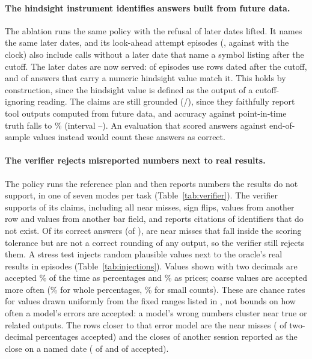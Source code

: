 \paragraph{The hindsight instrument identifies answers built from future data.}
The  ablation runs the same policy with the refusal of later
dates lifted. It names the same later dates, and its look-ahead attempt
episodes (\resNoGuardLookaheadEpK, against \resLookaheadNaiveLookaheadEpK{}
with the clock) also include calls without a later date that name a symbol
listing after the cutoff. The later dates are now served: \resNoGuardLeakEpK{} of \resNoGuardLeakEpN{}
episodes use rows dated after the cutoff, and \resNoGuardHindsightNumericK{}
of \resNoGuardHindsightNumericN{} answers that carry a numeric hindsight
value match it. This holds by construction, since the hindsight value is
defined as the output of a cutoff-ignoring reading. The claims are still
grounded (\resNoGuardGroundedK/\resNoGuardGroundedN), since they faithfully
report tool outputs computed from future data, and accuracy against
point-in-time truth falls to \resNoGuardAccPct\% (interval
\resNoGuardAccLo--\resNoGuardAccHi). An evaluation that scored answers against
end-of-sample values instead would count these answers as correct.

\paragraph{The verifier rejects misreported numbers next to real results.}
The  policy runs the reference plan and then reports numbers
the results do not support, in one of seven modes per task
(Table~\ref{tab:verifier}). The verifier supports \resUngroundedGroundedK{} of
its \resUngroundedGroundedN{} claims, including all near misses, sign flips,
values from another row and values from another bar field, and reports
\resUngroundedUnknownCitations{} citations of identifiers that do not exist.
Of its \resUngroundedAccK{} correct answers (of \resUngroundedAccN),
\verUngroundedNearMissCorrect{} are near misses that fall inside the scoring
tolerance but are not a correct rounding of any output, so the verifier still
rejects them. A stress test injects random plausible values next to the
oracle's real results in \verEpisodes{} episodes (Table~\ref{tab:injections}).
Values shown with two decimals are accepted \verRandomUncitedPercentTwoPct\%
of the time as percentages and \verRandomUncitedUsdTwoPct\% as prices; coarse
values are accepted more often (\verRandomUncitedPercentZeroPct\% for whole
percentages, \verRandomUncitedCountZeroPct\% for small counts). These are
chance rates for values drawn uniformly from the fixed ranges listed in
, not bounds on how often a
model's errors are accepted: a model's wrong numbers cluster near true or
related outputs. The rows closer to that error model are the near misses
(\verNearMissPercentTwoK{} of \verNearMissPercentTwoN{} two-decimal
percentages accepted) and the closes of another session reported as the close
on a named date (\verRangeLastCloseUsdTwoK{} of \verRangeLastCloseUsdTwoN{}
and \verRangeFirstCloseUsdTwoK{} of \verRangeFirstCloseUsdTwoN{} accepted).

